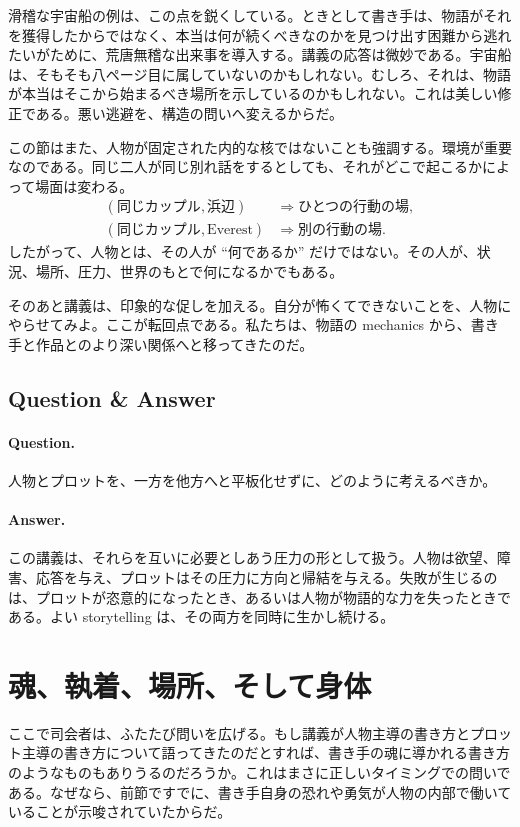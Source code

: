 滑稽な宇宙船の例は、この点を鋭くしている。ときとして書き手は、物語がそれを獲得したからではなく、本当は何が続くべきなのかを見つけ出す困難から逃れたいがために、荒唐無稽な出来事を導入する。講義の応答は微妙である。宇宙船は、そもそも八ページ目に属していないのかもしれない。むしろ、それは、物語が本当はそこから始まるべき場所を示しているのかもしれない。これは美しい修正である。悪い逃避を、構造の問いへ変えるからだ。

この節はまた、人物が固定された内的な核ではないことも強調する。環境が重要なのである。同じ二人が同じ別れ話をするとしても、それがどこで起こるかによって場面は変わる。
\begin{align}
(\text{同じカップル},\text{浜辺}) &\Rightarrow \text{ひとつの行動の場},\\
(\text{同じカップル},\text{Everest}) &\Rightarrow \text{別の行動の場}.
\end{align}
したがって、人物とは、その人が ``何であるか'' だけではない。その人が、状況、場所、圧力、世界のもとで何になるかでもある。

そのあと講義は、印象的な促しを加える。自分が怖くてできないことを、人物にやらせてみよ。ここが転回点である。私たちは、物語の mechanics から、書き手と作品とのより深い関係へと移ってきたのだ。

\subsection{Question \& Answer}

\paragraph{Question.} 人物とプロットを、一方を他方へと平板化せずに、どのように考えるべきか。

\paragraph{Answer.} この講義は、それらを互いに必要としあう圧力の形として扱う。人物は欲望、障害、応答を与え、プロットはその圧力に方向と帰結を与える。失敗が生じるのは、プロットが恣意的になったとき、あるいは人物が物語的な力を失ったときである。よい storytelling は、その両方を同時に生かし続ける。

\section{魂、執着、場所、そして身体}

ここで司会者は、ふたたび問いを広げる。もし講義が人物主導の書き方とプロット主導の書き方について語ってきたのだとすれば、書き手の魂に導かれる書き方のようなものもありうるのだろうか。これはまさに正しいタイミングでの問いである。なぜなら、前節ですでに、書き手自身の恐れや勇気が人物の内部で働いていることが示唆されていたからだ。

